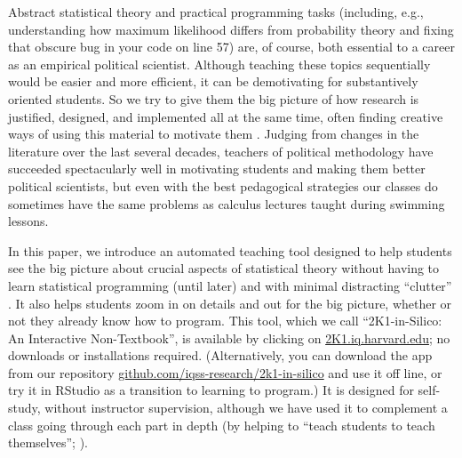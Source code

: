 \documentclass[12pt]{article}
\theoremstyle{definition}
\begin{document}
Abstract statistical theory and practical programming tasks (including, e.g., understanding how maximum likelihood differs from probability theory and fixing that obscure bug in your code on line 57) are, of course, both essential to a career as an empirical political scientist. Although teaching these topics sequentially would be easier and more efficient, it can be demotivating for substantively oriented students. So we try to give them the big picture of how research is justified, designed, and implemented all at the same time, often finding creative ways of using this material to motivate them \citep{williams2022teaching}. Judging from changes in the literature over the last several decades, teachers of political methodology have succeeded spectacularly well in motivating students and making them better political scientists, but even with the best pedagogical strategies our classes do sometimes have the same problems as calculus lectures taught during swimming lessons.

In this paper, we introduce an automated teaching tool designed to help students see the big picture about crucial aspects of statistical theory without having to learn statistical programming (until later) and with minimal distracting ``clutter'' \citep{bailey2019teaching}. It also helps students zoom in on details and out for the big picture, whether or not they already know how to program. This tool, which we call ``2K1-in-Silico: An Interactive Non-Textbook'', is available by clicking on \href{https://2k1.iq.harvard.edu}{2K1.iq.harvard.edu}; no downloads or installations required. (Alternatively, you can download the app from our repository \href{https://github.com/iqss-research/2k1-in-silico}{github.com/iqss-research/2k1-in-silico} and use it off line, or try it in RStudio as a transition to learning to program.) It is designed for self-study, without instructor supervision, although we have used it to complement a class going through each part in depth (by helping to ``teach students to teach themselves''; \citealt{Schleutker2022}).
\end{document}
